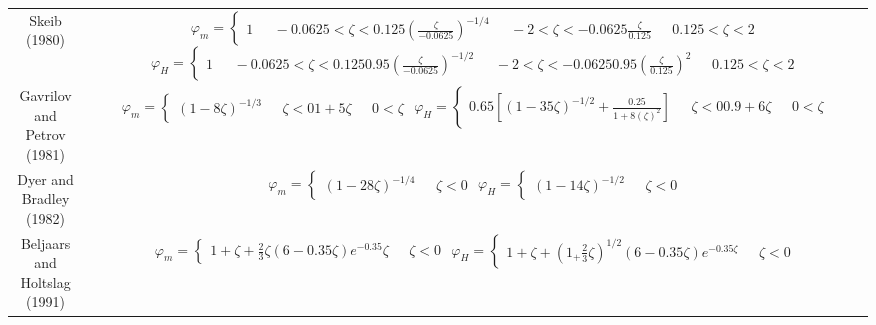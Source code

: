 {\begin{table}[p]
\begin{tabular}{| c | c |}
        Skeib (1980) \cite{foken:1990} & \shortstack{$\varphi_{m} = \begin{cases} 1 & \text{    } -0.0625 < \zeta < 0.125 \\ (\frac{\zeta}{-0.0625})^{-1/4} & \text{    } -2 < \zeta < -0.0625 \\ \frac{\zeta}{0.125} & \text{    } 0.125 < \zeta < 2 \\ \end{cases}$\\$\varphi_{H} = \begin{cases} 1 & \text{    } -0.0625 < \zeta < 0.125 \\ 0.95(\frac{\zeta}{-0.0625})^{-1/2} & \text{    } -2 < \zeta < -0.0625 \\ 0.95(\frac{\zeta}{0.125})^{2} & \text{    } 0.125 < \zeta < 2 \\ \end{cases}$ } \\ 
        \shortstack{Gavrilov and \\ Petrov (1981) \cite{gavrilov:1981}}  & \shortstack{$\varphi_{m} = \begin{cases} (1-8\zeta)^{-1/3} & \text{    } \zeta < 0\\ 1 + 5 \zeta & \text{    } 0 < \zeta\\ \end{cases}$\\$\varphi_{H} = \begin{cases} 0.65 \left[ (1-35\zeta)^{-1/2} + \frac{0.25}{1+8(\zeta)^{2}} \right] & \text{    } \zeta < 0\\ 0.9 + 6 \zeta & \text{    } 0 < \zeta\\ \end{cases}$ } \\ 
        \shortstack{Dyer and \\ Bradley (1982) \cite{dyer:1982}}  & \shortstack{$\varphi_{m} = \begin{cases} (1 - 28\zeta)^{-1/4} & \text{    } \zeta < 0 \\ \end{cases}$\\$\varphi_{H} = \begin{cases} (1 - 14\zeta)^{-1/2} & \text{    } \zeta < 0 \\ \end{cases}$ } \\ 
        \shortstack{Beljaars and \\ Holtslag (1991) \cite{beljaars:1991}}  &\shortstack{$\varphi_{m} = \begin{cases} 1 + \zeta + \frac{2}{3} \zeta (6 - 0.35 \zeta) e^{-0.35} \zeta & \text{    } \zeta < 0 \\ \end{cases}$\\$\varphi_{H} = \begin{cases} 1 + \zeta + (1_+ \frac{2}{3} \zeta)^{1/2} (6 - 0.35 \zeta) e^{-0.35 \zeta} & \text{    } \zeta < 0 \\ \end{cases}$ } \\ 

\end{tabular}
\end{table}}
